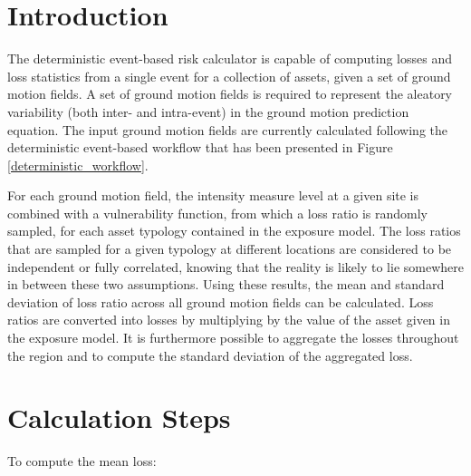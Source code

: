 

\section{Introduction}
The deterministic event-based risk calculator is capable of computing losses and loss statistics from a single event for a collection of assets, given a set of ground motion fields. A set of ground motion fields is required to represent the aleatory variability (both inter- and intra-event) in the ground motion prediction equation. The input ground motion fields are currently calculated following the deterministic event-based workflow that has been presented in Figure \ref{deterministic_workflow}. 

For each ground motion field, the intensity measure level at a given site is combined with a vulnerability function, from which a loss ratio is randomly sampled, for each asset typology contained in the exposure model. The loss ratios that are sampled for a given typology at different locations are considered to be independent or fully correlated, knowing that the reality is likely to lie somewhere in between these two assumptions. Using these results, the mean and standard deviation of loss ratio across all ground motion fields can be calculated. Loss ratios are converted into losses by multiplying by the value of the asset given in the exposure model. It is furthermore possible to aggregate the losses throughout the region and to compute the standard deviation of the aggregated loss. 

\section{Calculation Steps}

To compute the mean loss:

